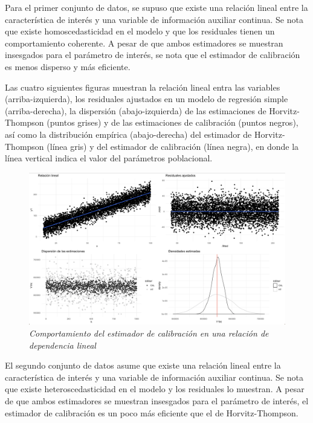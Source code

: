\documentclass[
  12pt,
]{book}
\begin{document}
Para el primer conjunto de datos, se supuso que existe una relación lineal entre la característica de interés y una variable de información auxiliar continua. Se nota que existe homoscedasticidad en el modelo y que los residuales tienen un comportamiento coherente. A pesar de que ambos estimadores se muestran insesgados para el parámetro de interés, se nota que el estimador de calibración es menos disperso y más eficiente.

Las cuatro siguientes figuras muestran la relación lineal entra las variables (arriba-izquierda), los residuales ajustados en un modelo de regresión simple (arriba-derecha), la dispersión (abajo-izquierda) de las estimaciones de Horvitz-Thompson (puntos grises) y de las estimaciones de calibración (puntos negros), así como la distribución empírica (abajo-derecha) del estimador de Horvitz-Thompson (línea gris) y del estimador de calibración (línea negra), en donde la línea vertical indica el valor del parámetros poblacional.

\begin{figure}
\centering
\includegraphics{Pics/c5.png}
\caption{\emph{Comportamiento del estimador de calibración en una relación de dependencia lineal}}
\end{figure}

El segundo conjunto de datos asume que existe una relación lineal entre la característica de interés y una variable de información auxiliar continua. Se nota que existe heteroscedasticidad en el modelo y los residuales lo muestran. A pesar de que ambos estimadores se muestran insesgados para el parámetro de interés, el estimador de calibración es un poco más eficiente que el de Horvitz-Thompson.
\end{document}
